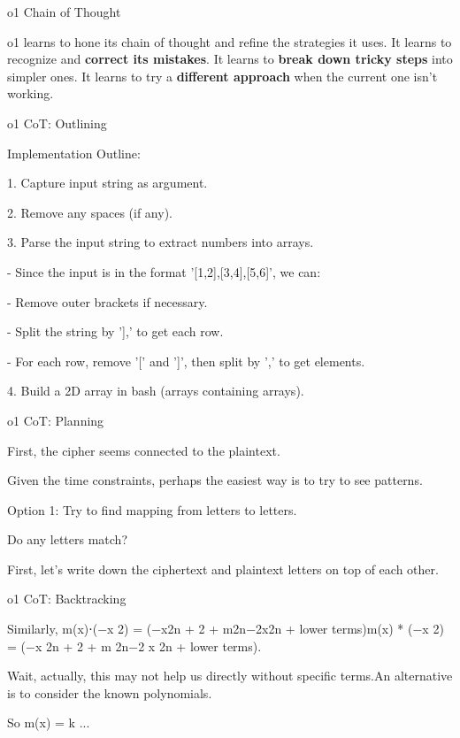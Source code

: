 \documentclass[14pt,aspectratio=169]{beamer}
\begin{document}
\begin{frame}{o1 Chain of Thought}
	\begin{tcolorbox}[colback=white,colframe=black,boxrule=0.5pt]
		o1 learns to hone its chain of thought and refine the strategies it uses.
		It learns to recognize and \textbf{correct its mistakes}.
		It learns to \textbf{break down tricky steps} into simpler ones.
		It learns to try a \textbf{different approach} when the current one isn’t working.
	\end{tcolorbox}
\end{frame}

\begin{frame}{o1 CoT: Outlining}
	\begin{tcolorbox}[colback=white,colframe=black,boxrule=0.5pt]

		Implementation Outline:

		1. Capture input string as argument.

		2. Remove any spaces (if any).

		3. Parse the input string to extract numbers into arrays.

		- Since the input is in the format '[1,2],[3,4],[5,6]', we can:

		- Remove outer brackets if necessary.

		- Split the string by '],' to get each row.

		- For each row, remove '[' and ']', then split by ',' to get elements.


		4. Build a 2D array in bash (arrays containing arrays).
	\end{tcolorbox}
\end{frame}


\begin{frame}{o1 CoT: Planning}
	\begin{tcolorbox}[colback=white,colframe=black,boxrule=0.5pt]
		First, the cipher seems connected to the plaintext.

		Given the time constraints, perhaps the easiest way is to try to see patterns.

		Option 1: Try to find mapping from letters to letters.

		Do any letters match?

		First, let's write down the ciphertext and plaintext letters on top of each other.
	\end{tcolorbox}
\end{frame}

\begin{frame}{o1 CoT: Backtracking}
	\begin{tcolorbox}[colback=white,colframe=black,boxrule=0.5pt]

		Similarly, m(x)⋅(−x 2) = (−x2n + 2 + m2n−2x2n + lower terms)m(x) * (−x 2) = (−x 2n + 2 + m 2n−2 x 2n + lower terms).

		Wait, actually, this may not help us directly without specific terms.An alternative is to consider the known polynomials.

		So m(x) = k ...
	\end{tcolorbox}
\end{frame}
\end{document}
